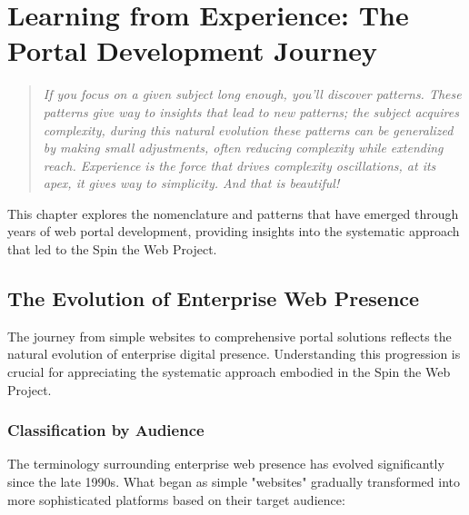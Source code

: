 
\chapter{Learning from Experience: The Portal Development Journey}
\label{chap:learning}

\begin{quote}
\textit{If you focus on a given subject long enough, you'll discover patterns. These patterns give way to insights that lead to new patterns; the subject acquires complexity, during this natural evolution these patterns can be generalized by making small adjustments, often reducing complexity while extending reach. Experience is the force that drives complexity oscillations, at its apex, it gives way to simplicity. And that is beautiful!}
\end{quote}

This chapter explores the nomenclature and patterns that have emerged through years of web portal development, providing insights into the systematic approach that led to the Spin the Web Project.

\section{The Evolution of Enterprise Web Presence}

The journey from simple websites to comprehensive portal solutions reflects the natural evolution of enterprise digital presence. Understanding this progression is crucial for appreciating the systematic approach embodied in the Spin the Web Project.

\subsection{Classification by Audience}

The terminology surrounding enterprise web presence has evolved significantly since the late 1990s. What began as simple "websites" gradually transformed into more sophisticated platforms based on their target audience:

